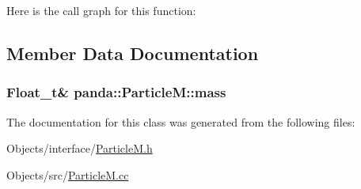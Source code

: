 Here is the call graph for this function:

\subsection{Member Data Documentation}
\hypertarget{classpanda_1_1ParticleM_afdf143108cea4cf0346b0b72ded0f640}{
\subsubsection[{mass}]{\setlength{\rightskip}{0pt plus 5cm}Float\_\-t\& {\bf panda::ParticleM::mass}}}
\label{classpanda_1_1ParticleM_afdf143108cea4cf0346b0b72ded0f640}


The documentation for this class was generated from the following files:\begin{DoxyCompactItemize}
\item 
Objects/interface/\hyperlink{ParticleM_8h}{ParticleM.h}\item 
Objects/src/\hyperlink{ParticleM_8cc}{ParticleM.cc}\end{DoxyCompactItemize}
